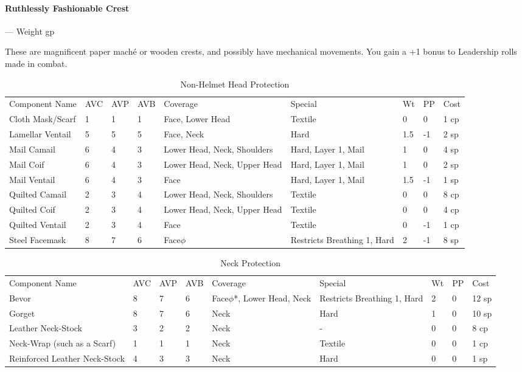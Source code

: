 \documentclass[oneside,11pt,english]{book}
\begin{document}
\vspace*{-10pt}\paragraph{Ruthlessly Fashionable Crest}--- Weight  gp\par
These are magnificent paper maché or wooden crests, and possibly have mechanical 
movements. You gain a +1 bonus to Leadership rolls made in combat.

\begin{longtabu} to 
	\caption{Non-Helmet Head Protection}
	\label{tab:Non-Helmet Head Protection}\\
Component Name&AVC&AVP&AVB& Coverage& Special& Wt&PP&Cost\\
Cloth Mask/Scarf& 1& 1& 1& Face, Lower Head &Textile&0&0&1 cp\\
Lamellar Ventail& 5& 5& 5& Face, Neck &Hard &1.5 &-1 &2 sp\\
Mail Camail& 6& 4& 3& Lower Head, Neck, Shoulders &Hard, Layer 1, Mail& 1& 0& 4 sp\\
Mail Coif& 6& 4& 3& Lower Head, Neck, Upper Head& Hard, Layer 1, Mail& 1& 0& 2 sp\\
Mail Ventail& 6& 4& 3& Face& Hard, Layer 1, Mail& 1.5 &-1& 1 sp\\
Quilted Camail& 2& 3& 4& Lower Head, Neck, Shoulders& Textile& 0& 0& 8 cp\\
Quilted Coif& 2& 3& 4& Lower Head, Neck, Upper Head& Textile& 0& 0& 4 cp\\
Quilted Ventail& 2& 3& 4& Face& Textile& 0 &-1& 1 cp\\
Steel Facemask& 8& 7& 6& Face$\phi$& Restricts Breathing 1, Hard& 2 &-1& 8 sp\\
\end{longtabu}

\begin{longtabu} to 
	\caption{Neck Protection}
	\label{tab:Neck Protection}\\
Component Name&AVC&AVP&AVB& Coverage& Special& Wt&PP& Cost\\
Bevor& 8& 7& 6& Face$\phi$*, Lower Head, Neck& Restricts Breathing 1, Hard& 2& 0& 12 sp\\
Gorget& 8& 7& 6& Neck& Hard& 1& 0& 10 sp\\
Leather Neck-Stock& 3& 2& 2& Neck &-& 0& 0& 8 cp\\
Neck-Wrap (such as a Scarf)& 1& 1& 1& Neck& Textile& 0& 0& 1 cp\\
Reinforced Leather Neck-Stock& 4& 3& 3& Neck& Hard& 0& 0& 1 sp\\
\end{longtabu}
\end{document}
